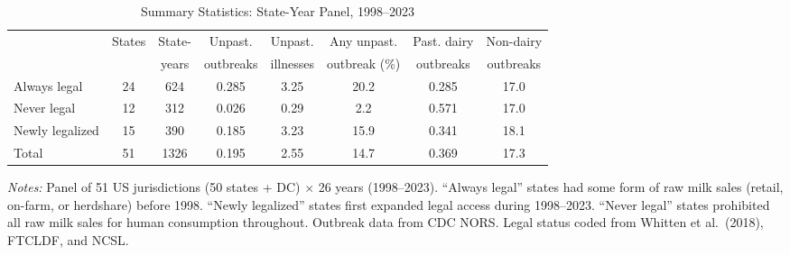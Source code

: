 \begin{table}[t]
\centering
\caption{Summary Statistics: State-Year Panel, 1998--2023}
\label{tab:summary}
\begin{adjustbox}{max width=\textwidth}
\begin{tabular}{lccccccc}
\hline\hline
 & States & State- & Unpast. & Unpast. & Any unpast. & Past. dairy & Non-dairy \\
 &        & years  & outbreaks & illnesses & outbreak (\%) & outbreaks & outbreaks \\
\hline
Always legal & 24 & 624 & 0.285 & 3.25 & 20.2 & 0.285 & 17.0 \\
Never legal & 12 & 312 & 0.026 & 0.29 & 2.2 & 0.571 & 17.0 \\
Newly legalized & 15 & 390 & 0.185 & 3.23 & 15.9 & 0.341 & 18.1 \\
\hline
Total & 51 & 1326 & 0.195 & 2.55 & 14.7 & 0.369 & 17.3 \\
\hline\hline
\end{tabular}
\end{adjustbox}
\begin{tablenotes}[flushleft]
\small
\item \textit{Notes:} Panel of 51 US jurisdictions (50 states + DC) $\times$ 26 years (1998--2023). ``Always legal'' states had some form of raw milk sales (retail, on-farm, or herdshare) before 1998. ``Newly legalized'' states first expanded legal access during 1998--2023. ``Never legal'' states prohibited all raw milk sales for human consumption throughout. Outbreak data from CDC NORS. Legal status coded from Whitten et al.\ (2018), FTCLDF, and NCSL.
\end{tablenotes}
\end{table}
